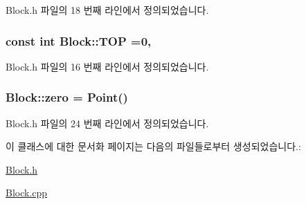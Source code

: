 Block.\+h 파일의 18 번째 라인에서 정의되었습니다.

\subsubsection[{\texorpdfstring{T\+OP}{TOP}}]{\setlength{\rightskip}{0pt plus 5cm}const int Block\+::\+T\+OP =0\hspace{0.3cm}{\ttfamily [static]}, {\ttfamily [private]}}\hypertarget{class_block_a8609875a08b9ec9e07aec1e9ed1e6c7f}{}\label{class_block_a8609875a08b9ec9e07aec1e9ed1e6c7f}


Block.\+h 파일의 16 번째 라인에서 정의되었습니다.

\subsubsection[{\texorpdfstring{zero}{zero}}]{ Block\+::zero = {\bf Point}()\hspace{0.3cm}{\ttfamily [static]}}\hypertarget{class_block_ad456f4794a480711f7057e1f270d93c2}{}\label{class_block_ad456f4794a480711f7057e1f270d93c2}


Block.\+h 파일의 24 번째 라인에서 정의되었습니다.



이 클래스에 대한 문서화 페이지는 다음의 파일들로부터 생성되었습니다.\+:\begin{DoxyCompactItemize}
\item 
\hyperlink{_block_8h}{Block.\+h}\item 
\hyperlink{_block_8cpp}{Block.\+cpp}\end{DoxyCompactItemize}
